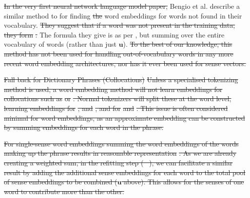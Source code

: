 \documentclass{article} %
\def\parencite{\cite} %
\renewcommand{\u}{\mathbf{u}}
\newcommand{\wordquote}[1]{\enquote{\texttt{#1}}}
\providecommand{\DIFadd}[1]{{\protect\color{blue}\uwave{#1}}} %
\providecommand{\DIFdel}[1]{{\protect\color{red}\sout{#1}}}                      %
\providecommand{\DIFaddbegin}{} %
\providecommand{\DIFaddend}{} %
\providecommand{\DIFdelbegin}{} %
\providecommand{\DIFdelend}{} %
\begin{document}
\DIFdelbegin \DIFdel{In the very first neural network language model paper, }\DIFdelend Bengio et al. \DIFdelbegin %
\DIFdelend \DIFaddbegin {} \DIFaddend describe a similar method to  for finding  \DIFdelbegin \DIFdel{the }\DIFdelend \DIFaddbegin \DIFadd{(single sense) }\DIFaddend word embeddings for words not found in their vocabulary.
\DIFdelbegin \DIFdel{They suggest that if a word was not present in the training data, they form }%
\DIFdel{. }\DIFdelend The formula they give is as per , but summing over the entire vocabulary of words (rather than just $\u$).
\DIFdelbegin \DIFdel{To the best of our knowledge, this method has not been used for handling out-of-vocabulary words in any more recent word embedding architectures, nor has it ever been used for sense vectors.
}\DIFdelend 


\DIFdelbegin %
\DIFdel{Fall back for Dictionary Phrases (Collocations)}%
\DIFdel{Unless a specialised tokenizing method is used, a word embedding method will not learn embeddings for collocations such as }%
\DIFdel{or }%
\DIFdel{. Normal tokenizers will split these at the word level, learning embeddings for }%
\DIFdel{, and }%
\DIFdel{, and for }%
\DIFdel{and }%
\DIFdel{. This issue is often considered minimal for word embeddings, as an approximate embedding can be constructed by summing embeddings for each word in the phrase.
}%

\DIFdel{For single-sense word embeddings  summing the word embeddings of the words making up the phrase results in reasonable representation }%
\DIFdel{.
As we are already creating a weighted sum, in the refitting step (\mbox{%
\Cref{eq:synth}}%
), we can facilitate a similar result by adding the additional sense embeddings for each word to the total pool of sense embeddings to be combined ($\u$ above). This allows for the senses of one word to contribute more than the other.
}%
\end{document}
